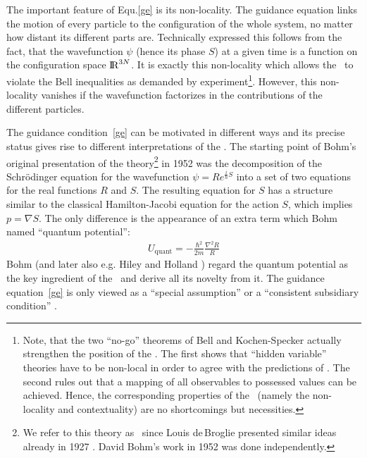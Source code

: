 The important feature of Equ.\ref{ge} is its non-locality. The guidance equation links the motion of every particle to the 
configuration of the whole system, no matter how distant its different parts are. Technically expressed this follows from 
the fact, 
that the wavefunction $\psi$ (hence its phase $S$) at a given time is a function on the configuration space ${\rm I\!R}^{3N}$.
It is exactly this non-locality which allows the \dbb\ to violate the Bell inequalities \cite{bell_ungl} 
as demanded by experiment\footnote{Note, that the two ``no-go'' theorems of Bell and Kochen-Specker actually strengthen the 
position of the \dbb. The first shows that ``hidden variable'' theories have to be non-local in order to agree with the 
predictions of \qm. The second rules out that a mapping of all observables to possessed values can be achieved. 
Hence, the corresponding properties of the \dbb\ (namely the non-locality and contextuality) are no shortcomings but 
necessities.}. However, this non-locality vanishes if the wavefunction factorizes in the contributions of the 
different particles. 

The guidance condition~\ref{ge} can be motivated in different ways and its precise status gives rise to different 
interpretations of the \dbb. 
The starting point of Bohm's original presentation of the theory\footnote{We refer to this theory as \dbb\ since 
Louis de$\,$Broglie presented similar ideas already in 1927 \cite{debroglie}. David Bohm's work in 1952 was done independently.} in 
1952 \cite{bohm1} was the 
decomposition of the Schr\"odinger equation for the wavefunction $\psi=Re^{\frac{i}{\hbar}S}$ into a set of two equations 
for the real functions $R$ and $S$. The resulting equation for $S$ has a structure similar to the classical Hamilton-Jacobi 
equation for the action $S$, which implies $p=\nabla S$. The only difference is the appearance of an extra term which Bohm 
named ``quantum potential'':
\begin{eqnarray}  
\label{qp}
U_{\mathrm{quant}}= - \frac{\hbar^2}{2m} \frac{\nabla^2 R}{R}
\end{eqnarray}
Bohm (and later also e.g. Hiley \cite{bh} and Holland \cite{holland}) regard the quantum potential as the key ingredient 
of the \dbb\ and  derive all its novelty from it. The guidance equation~\ref{ge} is only viewed as a  ``special assumption'' 
\cite{bohm2} or a ``consistent subsidiary condition'' \cite{bohm3}.

